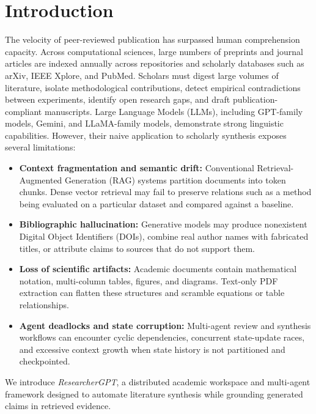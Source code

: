 \documentclass[conference]{IEEEtran}
\begin{document}
\section{Introduction}
The velocity of peer-reviewed publication has surpassed human comprehension capacity. Across computational sciences, large numbers of preprints and journal articles are indexed annually across repositories and scholarly databases such as arXiv, IEEE Xplore, and PubMed. Scholars must digest large volumes of literature, isolate methodological contributions, detect empirical contradictions between experiments, identify open research gaps, and draft publication-compliant manuscripts.
Large Language Models (LLMs), including GPT-family models, Gemini, and LLaMA-family models, demonstrate strong linguistic capabilities. However, their naive application to scholarly synthesis exposes several limitations:
\begin{itemize}
\item \textbf{Context fragmentation and semantic drift:} Conventional Retrieval-Augmented Generation (RAG) systems partition documents into token chunks. Dense vector retrieval may fail to preserve relations such as a method being evaluated on a particular dataset and compared against a baseline.
\item \textbf{Bibliographic hallucination:} Generative models may produce nonexistent Digital Object Identifiers (DOIs), combine real author names with fabricated titles, or attribute claims to sources that do not support them.
\item \textbf{Loss of scientific artifacts:} Academic documents contain mathematical notation, multi-column tables, figures, and diagrams. Text-only PDF extraction can flatten these structures and scramble equations or table relationships.
\item \textbf{Agent deadlocks and state corruption:} Multi-agent review and synthesis workflows can encounter cyclic dependencies, concurrent state-update races, and excessive context growth when state history is not partitioned and checkpointed.
\end{itemize}
We introduce \textit{ResearcherGPT}, a distributed academic workspace and multi-agent framework designed to automate literature synthesis while grounding generated claims in retrieved evidence.
\end{document}
